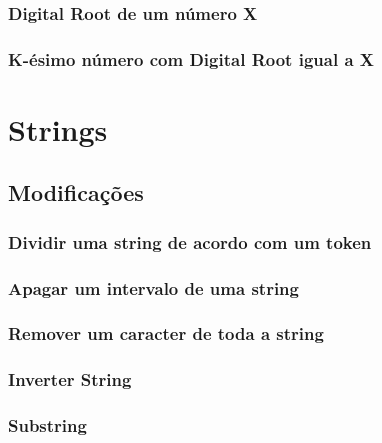 \documentclass[a4paper,12pt]{article}
\begin{document}
\subsubsection{Digital Root de um número X}

\subsubsection{K-ésimo número com Digital Root igual a X}



\newpage
\section{Strings}

\subsection{Modificações}

\subsubsection{Dividir uma string de acordo com um token}


\subsubsection{Apagar um intervalo de uma string}


\subsubsection{Remover um caracter de toda a string}


\subsubsection{Inverter String}


\subsubsection{Substring}
\end{document}
